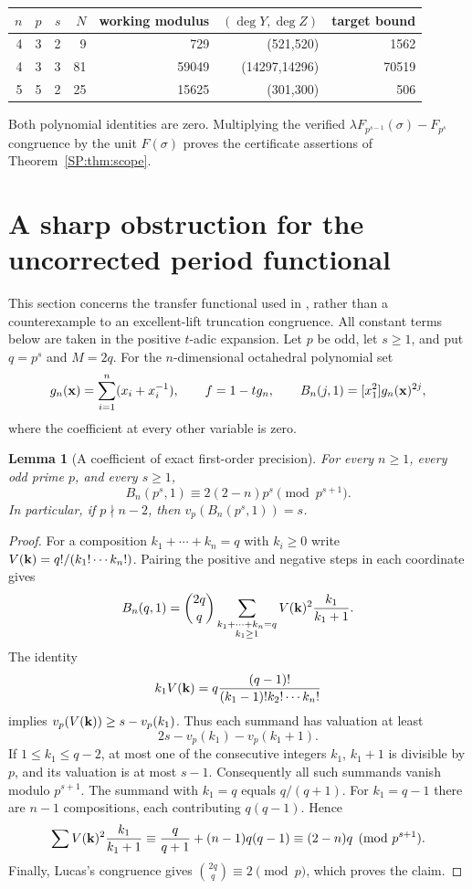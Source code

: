 \documentclass[11pt,a4paper]{article}
\newtheorem{lemma}[theorem]{Lemma}
\theoremstyle{definition}\newtheorem{definition}[theorem]{Definition}
\theoremstyle{remark}\newtheorem{remark}[theorem]{Remark}
\numberwithin{equation}{section}
\begin{document}
\begin{center}\small
\begin{tabular}{rrrrrrr}
\toprule
$n$&$p$&$s$&$N$&working modulus&$(\deg Y,\deg Z)$&target bound\\
\midrule
4&3&2&9&729&(521,520)&1562\\
4&3&3&81&59049&(14297,14296)&70519\\
5&5&2&25&15625&(301,300)&506\\
\bottomrule
\end{tabular}
\end{center}
Both polynomial identities are zero. Multiplying the verified
$\lambda F_{p^{s-1}}(\sigma)-F_{p^s}$ congruence by the unit
$F(\sigma)$ proves the certificate assertions of Theorem~\ref{SP:thm:scope}.

\section{A sharp obstruction for the uncorrected period functional}\label{SP:source-main-6}
\label{SP:sec:period-obstruction-small-primes}

This section concerns the transfer functional used in \cite[Section~4]{BV2}, rather than a counterexample to an
excellent-lift truncation congruence.  All constant terms below are taken
in the positive $t$-adic expansion.  Let $p$ be odd, let $s\geq1$, and put
$q=p^s$ and $M=2q$.  For the $n$-dimensional octahedral polynomial set
\[
 g_n({\bf x})=\sum_{i=1}^n(x_i+x_i^{-1}),\qquad
 f=1-tg_n,\qquad
 B_n(j,1)=[x_1^2]g_n({\bf x})^{2j},
\]
where the coefficient at every other variable is zero.

\begin{lemma}[A coefficient of exact first-order precision]
\label{SP:lem:octa-near-central-sharp}
For every $n\geq1$, every odd prime $p$, and every $s\geq1$,
\[
 B_n(p^s,1)\equiv 2(2-n)p^s\pmod{p^{s+1}}.
\]
In particular, if $p\nmid n-2$, then $v_p(B_n(p^s,1))=s$.
\end{lemma}

\begin{proof}
For a composition $k_1+\cdots+k_n=q$ with $k_i\geq0$ write
$V({\bf k})=q!/(k_1!\cdots k_n!)$.  Pairing the positive and negative
steps in each coordinate gives
\[
 B_n(q,1)=\binom{2q}{q}
 \sum_{\substack{k_1+\cdots+k_n=q\\ k_1\geq1}}
 V({\bf k})^2\frac{k_1}{k_1+1}.
\]
The identity
\[
 k_1 V({\bf k})
 =q\frac{(q-1)!}{(k_1-1)!k_2!\cdots k_n!}
\]
implies $v_p(V({\bf k}))\geq s-v_p(k_1)$.  Thus each summand has
valuation at least
\[
 2s-v_p(k_1)-v_p(k_1+1).
\]
If $1\leq k_1\leq q-2$, at most one of the consecutive integers $k_1$,
$k_1+1$ is divisible by $p$, and its valuation is at most $s-1$.
Consequently all such summands vanish modulo $p^{s+1}$.
The summand with $k_1=q$ equals $q/(q+1)$.
For $k_1=q-1$ there are $n-1$ compositions, each contributing
$q(q-1)$.  Hence
\[
 \sum V({\bf k})^2\frac{k_1}{k_1+1}
 \equiv\frac q{q+1}+(n-1)q(q-1)
 \equiv(2-n)q\pmod{p^{s+1}}.
\]
Finally, Lucas's congruence gives $\binom{2q}{q}\equiv2\pmod p$,
which proves the claim.
\end{proof}
\end{document}
